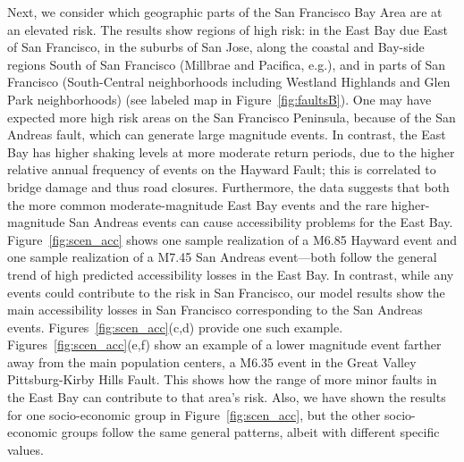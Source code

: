 Next, we consider which geographic parts of the San Francisco Bay Area are at an elevated risk. The results show regions of high risk: in the East Bay due East of San Francisco, in the suburbs of San Jose, along the coastal and Bay-side regions South of San Francisco (Millbrae and Pacifica, e.g.), and in parts of San Francisco (South-Central neighborhoods including Westland Highlands and Glen Park neighborhoods) (see labeled map in Figure~\ref{fig:faultsB}). One may have expected more high risk areas on the San Francisco Peninsula, because of the San Andreas fault, which can generate large magnitude events. In contrast, the East Bay has higher shaking levels at more moderate return periods, due to the higher relative annual frequency of events on the Hayward Fault; this is correlated to bridge damage and thus road closures. Furthermore, the data suggests that both the more common moderate-magnitude East Bay events and the rare higher-magnitude San Andreas events can cause accessibility problems for the East Bay. Figure~\ref{fig:scen_acc} shows one sample realization of a M6.85 Hayward event and one sample realization of a M7.45 San Andreas event---both follow the general trend of  high predicted accessibility losses in the East Bay.
In contrast, while any events could contribute to the risk in San Francisco, our model results show the main accessibility losses in San Francisco corresponding to the San Andreas events.
Figures~\ref{fig:scen_acc}{(c,d)} provide one such example. Figures~\ref{fig:scen_acc}{(e,f)} show an example of a lower magnitude event farther away from the main population centers, a M6.35 event in the Great Valley Pittsburg-Kirby Hills Fault. This shows how the range of more minor faults in the East Bay can contribute to that area's risk.
Also, we have shown the results for one socio-economic group in Figure~\ref{fig:scen_acc}, but the other socio-economic groups follow the same general patterns, albeit with different specific values.


